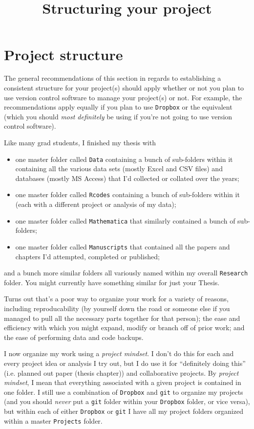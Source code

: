 \documentclass[12pt,letterpaper]{article}
\title{Structuring your project}
\begin{document}
\maketitle


\tableofcontents

\pagebreak

\section{Project structure} \label{projectsetup}
The general recommendations of this section in regards to establishing a consistent structure for your project(s) should apply whether or not you plan to use version control software to manage your project(s) or not.  For example, the recommendations apply equally if you plan to use \texttt{Dropbox} or the equivalent (which you should \emph{most definitely} be using if you're not going to use version control software).

Like many grad students, I finished my thesis with
\begin{itemize}
	\item one master folder called \texttt{Data} containing a bunch of sub-folders within it containing all the various data sets (mostly Excel and CSV files) and databases (mostly MS Access) that I'd collected or collated over the years;
	\item one master folder called \texttt{Rcodes} containing a bunch of sub-folders within it (each with a different project or analysis of my data);
	\item one master folder called \texttt{Mathematica} that similarly contained a bunch of sub-folders;
	\item one master folder called \texttt{Manuscripts} that contained all the papers and chapters I'd attempted, completed or published;
\end{itemize}
and a bunch more similar folders all variously named within my overall \texttt{Research} folder.  You might currently have something similar for just your Thesis.

Turns out that's a poor way to organize your work for a variety of reasons, including reproducability (by yourself down the road or someone else if you managed to pull all the necessary parts together for that person); the ease and efficiency with which you might expand, modify or branch off of prior work; and the ease of performing data and code backups.

I now organize my work using a \emph{project mindset}.  I don't do this for each and every project idea or analysis I try out, but I do use it for ``definitely doing this'' (i.e.  planned out paper (thesis chapter)) and collaborative projects.  By \emph{project mindset}, I mean that everything associated with a given project is contained in one folder.   I still use a combination of \texttt{Dropbox} and \texttt{git} to organize my projects (and you should \emph{never} put a \texttt{git} folder within your \texttt{Dropbox} folder, or vice versa), but within each of either \texttt{Dropbox} or \texttt{git} I have all my project folders organized within a master \texttt{Projects} folder.
\end{document}
